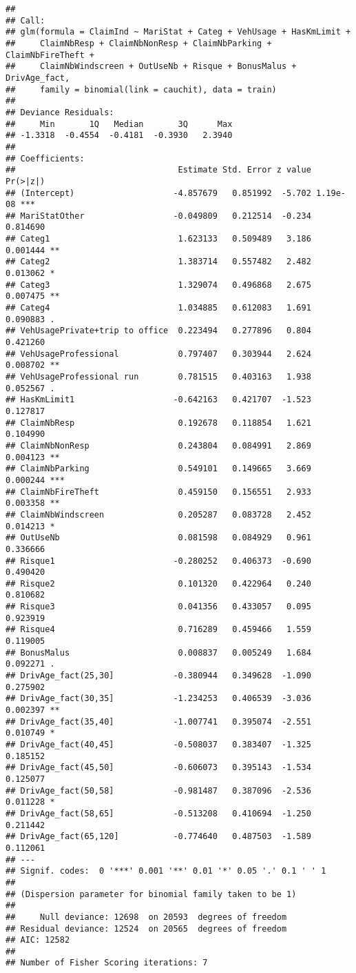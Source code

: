 \documentclass[
]{article}
\begin{document}
\begin{verbatim}
## 
## Call:
## glm(formula = ClaimInd ~ MariStat + Categ + VehUsage + HasKmLimit + 
##     ClaimNbResp + ClaimNbNonResp + ClaimNbParking + ClaimNbFireTheft + 
##     ClaimNbWindscreen + OutUseNb + Risque + BonusMalus + DrivAge_fact, 
##     family = binomial(link = cauchit), data = train)
## 
## Deviance Residuals: 
##     Min       1Q   Median       3Q      Max  
## -1.3318  -0.4554  -0.4181  -0.3930   2.3940  
## 
## Coefficients:
##                                 Estimate Std. Error z value Pr(>|z|)    
## (Intercept)                    -4.857679   0.851992  -5.702 1.19e-08 ***
## MariStatOther                  -0.049809   0.212514  -0.234 0.814690    
## Categ1                          1.623133   0.509489   3.186 0.001444 ** 
## Categ2                          1.383714   0.557482   2.482 0.013062 *  
## Categ3                          1.329074   0.496868   2.675 0.007475 ** 
## Categ4                          1.034885   0.612083   1.691 0.090883 .  
## VehUsagePrivate+trip to office  0.223494   0.277896   0.804 0.421260    
## VehUsageProfessional            0.797407   0.303944   2.624 0.008702 ** 
## VehUsageProfessional run        0.781515   0.403163   1.938 0.052567 .  
## HasKmLimit1                    -0.642163   0.421707  -1.523 0.127817    
## ClaimNbResp                     0.192678   0.118854   1.621 0.104990    
## ClaimNbNonResp                  0.243804   0.084991   2.869 0.004123 ** 
## ClaimNbParking                  0.549101   0.149665   3.669 0.000244 ***
## ClaimNbFireTheft                0.459150   0.156551   2.933 0.003358 ** 
## ClaimNbWindscreen               0.205287   0.083728   2.452 0.014213 *  
## OutUseNb                        0.081598   0.084929   0.961 0.336666    
## Risque1                        -0.280252   0.406373  -0.690 0.490420    
## Risque2                         0.101320   0.422964   0.240 0.810682    
## Risque3                         0.041356   0.433057   0.095 0.923919    
## Risque4                         0.716289   0.459466   1.559 0.119005    
## BonusMalus                      0.008837   0.005249   1.684 0.092271 .  
## DrivAge_fact(25,30]            -0.380944   0.349628  -1.090 0.275902    
## DrivAge_fact(30,35]            -1.234253   0.406539  -3.036 0.002397 ** 
## DrivAge_fact(35,40]            -1.007741   0.395074  -2.551 0.010749 *  
## DrivAge_fact(40,45]            -0.508037   0.383407  -1.325 0.185152    
## DrivAge_fact(45,50]            -0.606073   0.395143  -1.534 0.125077    
## DrivAge_fact(50,58]            -0.981487   0.387096  -2.536 0.011228 *  
## DrivAge_fact(58,65]            -0.513208   0.410694  -1.250 0.211442    
## DrivAge_fact(65,120]           -0.774640   0.487503  -1.589 0.112061    
## ---
## Signif. codes:  0 '***' 0.001 '**' 0.01 '*' 0.05 '.' 0.1 ' ' 1
## 
## (Dispersion parameter for binomial family taken to be 1)
## 
##     Null deviance: 12698  on 20593  degrees of freedom
## Residual deviance: 12524  on 20565  degrees of freedom
## AIC: 12582
## 
## Number of Fisher Scoring iterations: 7
\end{verbatim}
\end{document}
